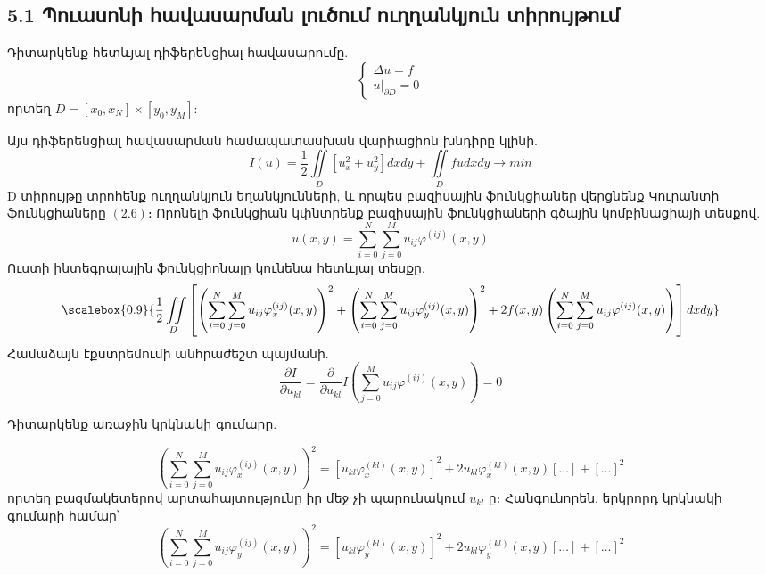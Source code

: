 \documentclass[fleqn, bachelor,subf,12pt,notitlepage]{article}
\newcommand\scalemath[2]{\scalebox{#1}{\mbox{\ensuremath{\displaystyle #2}}}}
\begin{document}
\subsection*{{5.1 Պուասոնի հավասարման լուծում ուղղանկյուն տիրույթում}}

Դիտարկենք հետևյալ դիֆերենցիալ հավասարումը.
\begin{equation}
\begin{cases}
			\Delta u =f \\
			u \Big |_{\partial D} = 0
\end{cases}
\end{equation}
որտեղ $D = \left[x_{0}, x_{N}\right] \times \left[y_{0}, y_{M}\right]$:

Այս դիֆերենցիալ հավասարման  համապատասխան վարիացիոն խնդիրը կլինի.
\begin{equation}
I(u) = \frac{1}{2}\iint \limits_{D} \left[u_x^2 + u_y^2 \right]dxdy + \iint \limits_{D} fudxdy \longrightarrow min
\end{equation}
D տիրույթը տրոհենք ուղղանկյուն եղանկյունների, և որպես բազիսային ֆունկցիաներ վերցնենք Կուրանտի ֆունկցիաները $\left(2.6\right)$։
Որոնելի ֆունկցիան կփնտրենք բազիսային ֆունկցիաների գծային կոմբինացիայի տեսքով.
\begin{equation}
u(x,y) = \sum_{i=0}^{N} \sum_{j=0}^{M} u_{ij}\varphi^{(ij)}(x,y)
\end{equation}
Ուստի ինտեգրալային ֆունկցիոնալը կունենա հետևյալ տեսքը.
\begin{equation}
$$\scalemath{0.9}{\frac{1}{2} \iint \limits_{D}\left[\left(\sum_{i=0}^{N} \sum_{j=0}^{M}u_{ij}\varphi_{x}^{(ij)}(x,y)\right)^2 + \left(\sum_{i=0}^{N} \sum_{j=0}^{M}u_{ij}\varphi_{y}^{(ij)}(x,y)\right)^2+2f(x,y)\left( \sum_{i=0}^{N} \sum_{j=0}^{M}u_{ij}\varphi^{(ij)}(x,y)\right)\right]dxdy}
\end{equation}
Համաձայն էքստրեմումի անհրաժեշտ պայմանի.
$$\dfrac{\partial I}{ \partial u_{kl}} = \dfrac{\partial}{\partial u_{kl}} I \left(\sum_{j=0}^{M} u_{ij}\varphi^{(ij)}(x,y)\right) = 0 $$

Դիտարկենք առաջին կրկնակի գումարը.

$$\left(\sum_{i=0}^{N} \sum_{j=0}^{M}u_{ij}\varphi_{x}^{(ij)}(x,y)\right)^2 = \left[u_{kl}\varphi_{x}^{(kl)}(x,y)\right]^{2} + 2u_{kl}\varphi_{x}^{(kl)}(x,y)[\dots] + [\dots]^2$$
որտեղ բազմակետերով արտահայտությունը իր մեջ չի պարունակում $u_{kl}$ ը։
Հանգունորեն, երկրորդ կրկնակի գումարի համար՝
$$\left(\sum_{i=0}^{N} \sum_{j=0}^{M}u_{ij}\varphi_{y}^{(ij)}(x,y)\right)^2 = \left[u_{kl}\varphi_{y}^{(kl)}(x,y)\right]^{2} + 2u_{kl}\varphi_{y}^{(kl)}(x,y)[\dots] + [\dots]^2$$
\end{document}
